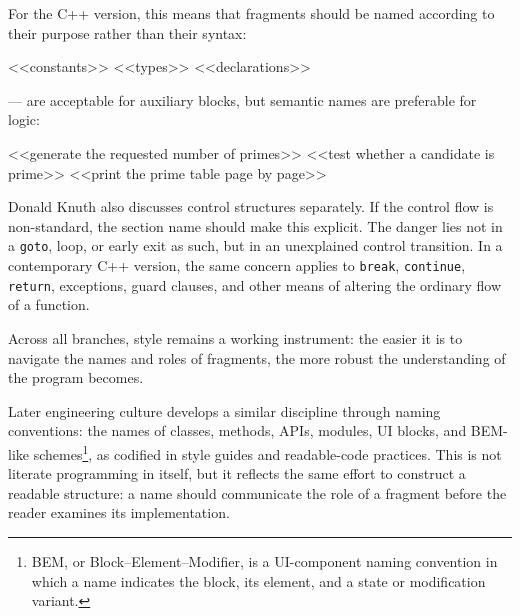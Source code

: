 \documentclass{ZGJournalArticle_2026}
\newenvironment{Shaded}{}{}
\newcommand{\NormalTok}[1]{#1}
\begin{document}
For the C++ version, this means that fragments should be named according
to their purpose rather than their syntax:

\begin{Shaded}
\begin{Highlighting}[]
\NormalTok{\textless{}\textless{}constants\textgreater{}\textgreater{}}
\NormalTok{\textless{}\textless{}types\textgreater{}\textgreater{}}
\NormalTok{\textless{}\textless{}declarations\textgreater{}\textgreater{}}
\end{Highlighting}
\end{Shaded}

--- are acceptable for auxiliary blocks, but semantic names are
preferable for logic:

\begin{Shaded}
\begin{Highlighting}[]
\NormalTok{\textless{}\textless{}generate the requested number of primes\textgreater{}\textgreater{}}
\NormalTok{\textless{}\textless{}test whether a candidate is prime\textgreater{}\textgreater{}}
\NormalTok{\textless{}\textless{}print the prime table page by page\textgreater{}\textgreater{}}
\end{Highlighting}
\end{Shaded}

Donald Knuth also discusses control structures separately. If the
control flow is non-standard, the section name should make this
explicit. The danger lies not in a \texttt{goto}, loop, or early exit as
such, but in an unexplained control transition. In a contemporary C++
version, the same concern applies to \texttt{break}, \texttt{continue},
\texttt{return}, exceptions, guard clauses, and other means of altering
the ordinary flow of a function.

Across all branches, style remains a working instrument: the easier it
is to navigate the names and roles of fragments, the more robust the
understanding of the program becomes.

Later engineering culture develops a similar discipline through naming
conventions: the names of classes, methods, APIs, modules, UI blocks,
and BEM-like schemes\footnote{BEM, or Block--Element--Modifier, is a
  UI-component naming convention in which a name indicates the block,
  its element, and a state or modification variant.}, as codified in
style guides and readable-code practices. This is not literate
programming in itself, but it reflects the same effort to construct a
readable structure: a name should communicate the role of a fragment
before the reader examines its implementation.
\end{document}
